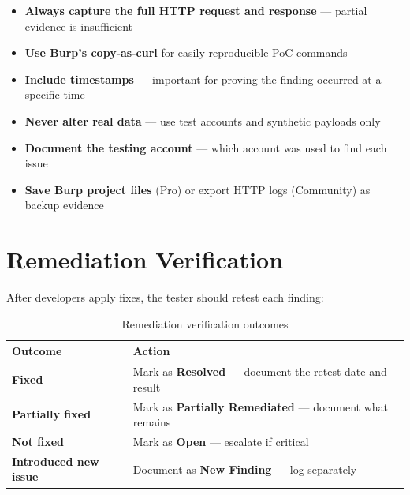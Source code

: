 \begin{itemize}
  \item \textbf{Always capture the full HTTP request and response} — partial evidence is insufficient
  \item \textbf{Use Burp's copy-as-curl} for easily reproducible PoC commands
  \item \textbf{Include timestamps} — important for proving the finding occurred at a specific time
  \item \textbf{Never alter real data} — use test accounts and synthetic payloads only
  \item \textbf{Document the testing account} — which account was used to find each issue
  \item \textbf{Save Burp project files} (Pro) or export HTTP logs (Community) as backup evidence
\end{itemize}

\section{Remediation Verification}

After developers apply fixes, the tester should retest each finding:

\begin{table}[H]
\centering
\caption{Remediation verification outcomes}
\begin{tabularx}{\textwidth}{>{\bfseries}lX}
\toprule
Outcome & Action \\
\midrule
Fixed & Mark as \textbf{Resolved} — document the retest date and result \\
Partially fixed & Mark as \textbf{Partially Remediated} — document what remains \\
Not fixed & Mark as \textbf{Open} — escalate if critical \\
Introduced new issue & Document as \textbf{New Finding} — log separately \\
\bottomrule
\end{tabularx}
\end{table}

